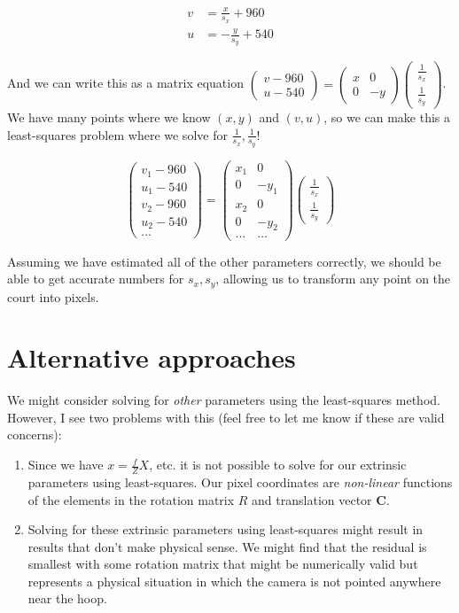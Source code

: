 \documentclass{article}
\begin{document}
\begin{align*}
v&=\frac{x}{s_{x}}+960 \\
u&=-\frac{y}{s_{y}}+540
\end{align*}

And we can write this as a matrix equation $\begin{pmatrix} v-960 \\ u-540 \end{pmatrix}=\begin{pmatrix} x & 0 \\ 0 & -y \end{pmatrix}\begin{pmatrix} \frac{1}{s_x} \\ \frac{1}{s_y} \end{pmatrix}$. We have many points where we know $(x, y)$ and $(v, u)$, so we can make this a least-squares problem where we solve for $\frac{1}{s_x}, \frac{1}{s_y}$!

\[\begin{pmatrix} v_1-960 \\ u_1-540 \\ v_2-960 \\ u_2-540 \\ \hdots \end{pmatrix}=\begin{pmatrix} x_1 & 0 \\ 0 & -y_1 \\ x_2 & 0 \\ 0 & -y_2 \\ \hdots & \hdots \end{pmatrix}\begin{pmatrix} \frac{1}{s_x} \\ \frac{1}{s_y} \end{pmatrix}\]

Assuming we have estimated all of the other parameters correctly, we should be able to get accurate numbers for $s_x, s_y$, allowing us to transform any point on the court into pixels.

\section{Alternative approaches}
We might consider solving for \textit{other} parameters using the least-squares method. However, I see two problems with this (feel free to let me know if these are valid concerns):
\begin{enumerate}
  \item Since we have $x=\frac{f}{Z}X$, etc. it is not possible to solve for our extrinsic parameters using least-squares. Our pixel coordinates are \textit{non-linear} functions of the elements in the rotation matrix $R$ and translation vector $\bm{C}$.
  \item Solving for these extrinsic parameters using least-squares might result in results that don't make physical sense. We might find that the residual is smallest with some rotation matrix that might be numerically valid but represents a physical situation in which the camera is not pointed anywhere near the hoop.
\end{enumerate}
\end{document}
